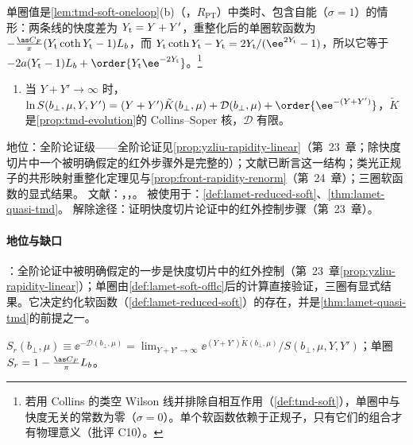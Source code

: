 单圈值是\cref{lem:tmd-soft-oneloop}(b)（\tagR，$R_{\mathrm{PT}}$）中类时、包含自能（$\sigma=1$）的情形：两条线的快度差为 $Y_{\rm t}=Y+Y'$，重整化后的单圈软函数为 $-\frac{\as C_F}\pi(Y_{\rm t}\coth Y_{\rm t}-1)L_b$，而 $Y_{\rm t}\coth Y_{\rm t}-Y_{\rm t}=2Y_{\rm t}/(\ee^{2Y_{\rm t}}-1)$，所以它等于 $-2a(Y_{\rm t}-1)L_b+\order{Y_{\rm t}\ee^{-2Y_{\rm t}}}$。\footnote{若用 Collins 的类空 Wilson 线并排除自相互作用（\cref{def:tmd-soft}），单圈中与快度无关的常数为零（$\sigma=0$）。单个软函数依赖于正规子，只有它们的组合才有物理意义（批评 C10）。}

\begin{assumption}\label{asm:lamet-soft-rapidity}
\begin{enumerate}[label=(SR),leftmargin=3.2em,itemsep=1pt,topsep=2pt]
\item 当 $Y+Y'\to\infty$ 时，$\ln S(b_\perp,\mu,Y,Y')=(Y+Y')\tilde K(b_\perp,\mu)+\mathcal D(b_\perp,\mu)+\order{\ee^{-(Y+Y')}}$，$\tilde K$ 是\cref{prop:tmd-evolution}的 Collins--Soper 核，$\mathcal D$ 有限。
\end{enumerate}
地位：全阶论证级——全阶论证见\cref{prop:yzliu-rapidity-linear}（第~23~章；除快度切片中一个被明确假定的红外步骤外是完整的）；文献\cite{CollinsSoper1981}已断言这一结构；类光正规子的共形映射重整化定理见\cite{Vladimirov:2017ksc}与\cref{prop:front-rapidity-renorm}（第~24~章）；三圈软函数的显式结果\cite{Li:2016axz}。
文献：\cite{Ji:2019sxk}，\cite[附录~E]{Liu:2022nnk}，\cite{CollinsSoper1981,Vladimirov:2017ksc,Li:2016axz}。
被使用于：\cref{def:lamet-reduced-soft}、\cref{thm:lamet-quasi-tmd}。
解除途径：证明快度切片论证中的红外控制步骤（第~23~章）。
\end{assumption}

\paragraph{地位与缺口}
\tagA：全阶论证中被明确假定的一步是快度切片中的红外控制（第~23~章\cref{prop:yzliu-rapidity-linear}）；单圈由\cref{def:lamet-soft-offlc}后的计算直接验证，三圈有显式结果\cite{Li:2016axz}。它决定约化软函数（\cref{def:lamet-reduced-soft}）的存在，并是\cref{thm:lamet-quasi-tmd}的前提之一。

\begin{definition}[约化软函数 $S_r$]\label{def:lamet-reduced-soft}
$S_r(b_\perp,\mu)\equiv\ee^{-\mathcal D(b_\perp,\mu)}=\lim_{Y+Y'\to\infty}\ee^{(Y+Y')\tilde K(b_\perp,\mu)}/S(b_\perp,\mu,Y,Y')$；单圈 $S_r=1-\frac{\as C_F}\pi L_b$。%
\end{definition}

